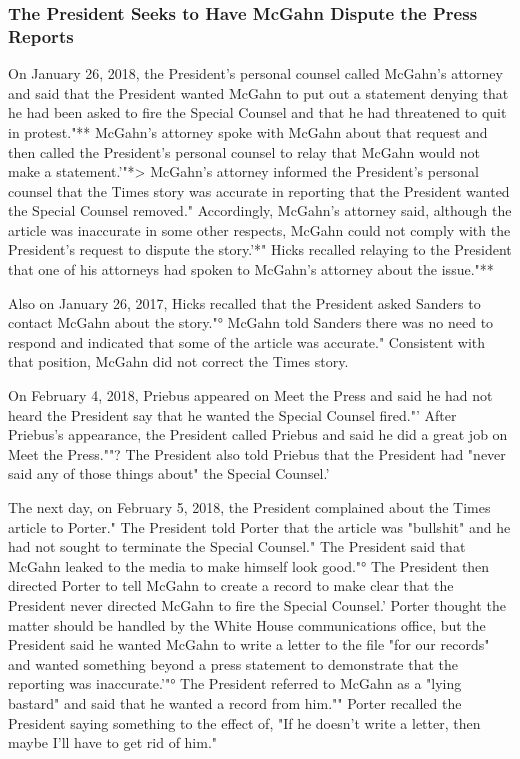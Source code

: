 \subsubsection{The President Seeks to Have McGahn Dispute the Press Reports}

On January 26, 2018, the President's personal counsel called McGahn's attorney and said that the President wanted McGahn to put out a statement denying that he had been asked to fire the Special Counsel and that he had threatened to quit in protest."**
McGahn's attorney spoke with McGahn about that request and then called the President's personal counsel to relay that McGahn would not make a statement.'"*>
McGahn's attorney informed the President's personal counsel that the Times story was accurate in reporting that the President wanted the Special Counsel removed."
Accordingly, McGahn's attorney said, although the article was inaccurate in some other respects, McGahn could not comply with the President's request to dispute the story.'*"
Hicks recalled relaying to the President that one of his attorneys had spoken to McGahn's attorney about the issue."**

Also on January 26, 2017, Hicks recalled that the President asked Sanders to contact McGahn about the story."° McGahn told Sanders there was no need to respond and indicated that some of the article was accurate."
Consistent with that position, McGahn did not correct the Times story.

On February 4, 2018, Priebus appeared on Meet the Press and said he had not heard the President say that he wanted the Special Counsel fired."'
After Priebus's appearance, the President called Priebus and said he did a great job on Meet the Press.""?
The President also told Priebus that the President had "never said any of those things about" the Special Counsel.'

The next day, on February 5, 2018, the President complained about the Times article to Porter."
The President told Porter that the article was "bullshit" and he had not sought to terminate the Special Counsel."
The President said that McGahn leaked to the media to make himself look good."°
The President then directed Porter to tell McGahn to create a record to make clear that the President never directed McGahn to fire the Special Counsel.'
Porter thought the matter should be handled by the White House communications office, but the President said he wanted McGahn to write a letter to the file "for our records" and wanted something beyond a press statement to demonstrate that the reporting was inaccurate.'"°
The President referred to McGahn as a "lying bastard" and said that he wanted a record from him.""
Porter recalled the President saying something to the effect of, "If he doesn't write a letter, then maybe I'll have to get rid of him."

